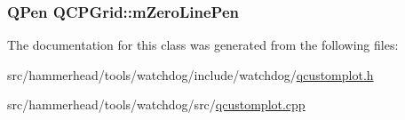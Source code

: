 \subsubsection[{\texorpdfstring{m\+Zero\+Line\+Pen}{mZeroLinePen}}]{\setlength{\rightskip}{0pt plus 5cm}Q\+Pen Q\+C\+P\+Grid\+::m\+Zero\+Line\+Pen\hspace{0.3cm}{\ttfamily [protected]}}\hypertarget{classQCPGrid_a379481871f17655c27eda30af233554f}{}\label{classQCPGrid_a379481871f17655c27eda30af233554f}


The documentation for this class was generated from the following files\+:\begin{DoxyCompactItemize}
\item 
src/hammerhead/tools/watchdog/include/watchdog/\hyperlink{qcustomplot_8h}{qcustomplot.\+h}\item 
src/hammerhead/tools/watchdog/src/\hyperlink{qcustomplot_8cpp}{qcustomplot.\+cpp}\end{DoxyCompactItemize}
